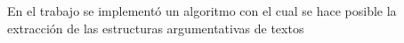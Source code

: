 \begin{conclusions}


En el trabajo se implementó un algoritmo con el cual se hace posible la extracción de las estructuras
argumentativas de textos 


\end{conclusions}
